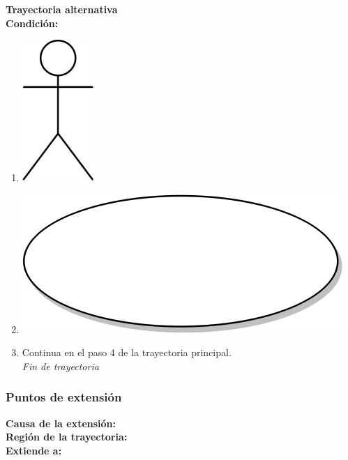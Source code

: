 \textbf{Trayectoria alternativa} \label{cu_ta_} \\
\textbf{Condición:} \\
 \begin{enumerate}[label=\arabic*]
    \item {\includegraphics[scale=.1]{Capitulo3/img/actor.png} }
    \item {\includegraphics[scale=.05]{Capitulo3/img/proceso.png}}
    \item {Continua en el paso 4 de la trayectoria principal.} \\
    \textit{Fin de trayectoria} \\
\end{enumerate}

\subsubsection{Puntos de extensión}
\noindent \textbf{Causa de la extensión:} \\
\textbf{Región de la trayectoria:} \\
\textbf{Extiende a:} 
